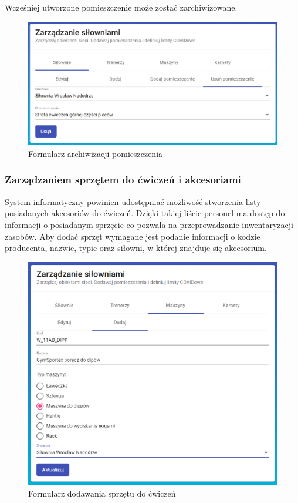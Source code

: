 \documentclass[a4paper,twoside,12pt]{book}
\begin{document}
{Wcześniej utworzone pomieszczenie może zostać zarchiwizowane.
\begin{figure}[h!]
	\centering
	\includegraphics[width=1\linewidth]{../zrzuty_ekranu/dzialanie/pomieszczenia/usuwanie}
	\caption{Formularz archiwizacji pomieszczenia}
	\label{fig:archwizacja_pomieszczenia}
\end{figure}
\FloatBarrier


\subsubsection{Zarządzaniem sprzętem do ćwiczeń i akcesoriami}
System informatyczny powinien udostępniać możliwość stworzenia listy posiadanych akcesoriów do ćwiczeń. Dzięki takiej liście personel ma dostęp do informacji o posiadanym sprzęcie co pozwala na przeprowadzanie inwentaryzacji zasobów. Aby dodać sprzęt wymagane jest podanie informacji o kodzie producenta, nazwie, typie oraz siłowni, w której znajduje się akcesorium.
\begin{figure}[h!]
	\centering
	\includegraphics[width=1\linewidth]{../zrzuty_ekranu/dzialanie/akcesoria/dodawanie_akcesoriun}
	\caption{Formularz dodawania sprzętu do ćwiczeń}
	\label{fig:dodawanieakcesoriun}
\end{figure}
\FloatBarrier

}
\end{document}
